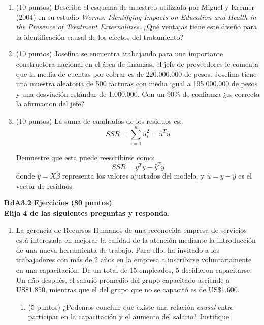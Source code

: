 \documentclass{article} %
\begin{document}
{\begin{enumerate}
 
    \item (10 puntos) Describa el esquema de muestreo utilizado por Miguel y Kremer (2004) en su estudio {\it Worms: Identifying Impacts on Education and Health in the Presence of Treatment Externalities}.
    ¿Qué ventajas tiene este diseño para la identificación causal de los efectos del tratamiento?

\item  (10 puntos) Josefina se encuentra trabajando para una importante constructora nacional en el \'area de finanzas, el jefe de
proveedores le comenta que la media de cuentas por cobrar es de 220.000.000 de pesos. Josefina tiene una  muestra aleatoria de 500 facturas con media igual a 195.000.000 de pesos y una desviaci\'on
est\'andar de 1.000.000. Con un 90\% de confianza ¿es correcta la afirmacion del jefe?






\item (10 puntos) La  suma de cuadrados de los residuos es:
    \[
    SSR = \sum_{i=1}^{n} \hat{u}_i^2 = \hat{u}^T \hat{u}
    \]
    
Demuestre que esta puede reescribirse como:
    \[
    SSR = y^T y - \hat{y}^T y
    \]
    donde \( \hat{y} = X \hat{\beta} \) representa los valores ajustados del modelo, y \( \hat{u} = y - \hat{y} \) es el vector de residuos.

\end{enumerate}

\vspace{1.5cm}

{\bf RdA3.2 Ejercicios (80 puntos)}\\

{\bf Elija 4 de las siguientes preguntas y responda.} 
\begin{enumerate}
  \item La gerencia de Recursos Humanos de una reconocida empresa de servicios está interesada en mejorar la calidad de la atención mediante la introducción de una nueva herramienta de trabajo. Para ello, ha invitado a los trabajadores con más de 2 años en la empresa a inscribirse voluntariamente en una capacitación. De un total de 15 empleados, 5 decidieron capacitarse. Un año después, el salario promedio del grupo capacitado asciende a US\$1.850, mientras que el del grupo que no se capacitó es de US\$1.600.
\begin{enumerate}
      \item  (5 puntos) ¿Podemos concluir que existe una relación \textit{causal} entre participar en la capacitación y el aumento del salario? Justifique.


\end{enumerate}
\end{enumerate}}
\end{document}
